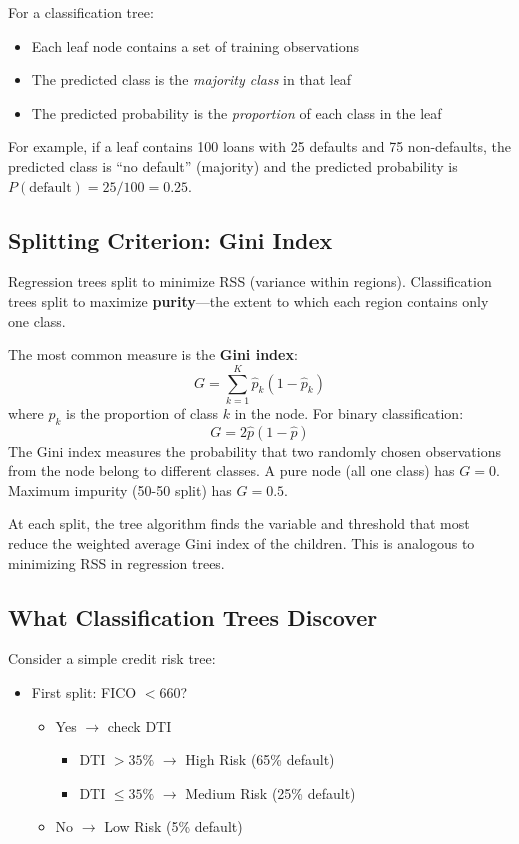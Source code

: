 \documentclass[11pt,a4paper]{article}
\newcommand{\keyword}[1]{\textbf{\textcolor{AccentOrange}{#1}}}
\begin{document}
For a classification tree:
\begin{itemize}
    \item Each leaf node contains a set of training observations
    \item The predicted class is the \emph{majority class} in that leaf
    \item The predicted probability is the \emph{proportion} of each class in the leaf
\end{itemize}

For example, if a leaf contains 100 loans with 25 defaults and 75 non-defaults, the predicted class is ``no default'' (majority) and the predicted probability is $P(\text{default}) = 25/100 = 0.25$.

\subsection{Splitting Criterion: Gini Index}

Regression trees split to minimize RSS (variance within regions). Classification trees split to maximize \keyword{purity}---the extent to which each region contains only one class.

The most common measure is the \keyword{Gini index}:
\[
G = \sum_{k=1}^{K} \widehat{p}_k (1 - \widehat{p}_k)
\]
where $\widehat{p}_k$ is the proportion of class $k$ in the node. For binary classification:
\[
G = 2 \widehat{p}(1 - \widehat{p})
\]
The Gini index measures the probability that two randomly chosen observations from the node belong to different classes. A pure node (all one class) has $G = 0$. Maximum impurity (50-50 split) has $G = 0.5$.

At each split, the tree algorithm finds the variable and threshold that most reduce the weighted average Gini index of the children. This is analogous to minimizing RSS in regression trees.

\subsection{What Classification Trees Discover}

Consider a simple credit risk tree:
\begin{itemize}
    \item First split: FICO $< 660$?
    \begin{itemize}
        \item Yes $\rightarrow$ check DTI
        \begin{itemize}
            \item DTI $> 35\%$ $\rightarrow$ High Risk (65\% default)
            \item DTI $\leq 35\%$ $\rightarrow$ Medium Risk (25\% default)
        \end{itemize}
        \item No $\rightarrow$ Low Risk (5\% default)
    \end{itemize}
\end{itemize}
\end{document}
